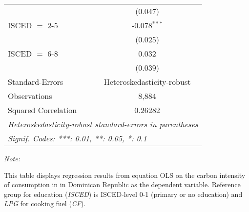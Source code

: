 \begin{table}[htbp!]
\begin{adjustbox}{width = 1\textwidth, max height = 0.95\textheight, center}
\begin{threeparttable}[b]
\begin{tabular}{lc}
                                & (0.047)\\   
            ISCED $=$ 2-5       & -0.078$^{***}$\\   
                                & (0.025)\\   
            ISCED $=$ 6-8       & 0.032\\   
                                & (0.039)\\   
            \midrule 
            Standard-Errors     & Heteroskedasticity-robust \\   
            Observations        & 8,884\\  
            Squared Correlation & 0.26282\\  
            \midrule \midrule
            \multicolumn{2}{l}{\emph{Heteroskedasticity-robust standard-errors in parentheses}}\\
            \multicolumn{2}{l}{\emph{Signif. Codes: ***: 0.01, **: 0.05, *: 0.1}}\\
         \end{tabular}
         
         \begin{tablenotes}\item \medskip \textit{Note:}
            \item This table displays regression results from equation OLS on the carbon intensity of consumption in  in Dominican Republic as the dependent variable. Reference group for education (\textit{ISCED}) is ISCED-level 0-1 (primary or no education) and \textit{LPG} for cooking fuel (\textit{CF}).
         \end{tablenotes}
      \end{threeparttable}
   \end{adjustbox}
\end{table}


